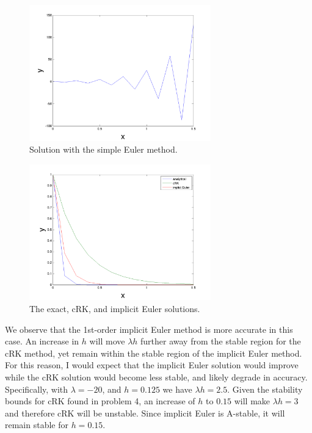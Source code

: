 \documentclass[11pt]{article}
\begin{document}
\begin{enumerate}
\begin{figure}[h!]
  \centering
    \includegraphics[width=0.7\textwidth]{andy_hw04_prb07_01.png}
  \caption{Solution with the simple Euler method.}
\end{figure}

\begin{figure}[h!]
  \centering
    \includegraphics[width=0.7\textwidth]{andy_hw04_prb07_02.png}
  \caption{The exact, cRK, and implicit Euler solutions.}
\end{figure}

We observe that the 1st-order implicit Euler method is more accurate in this case.
An increase in $h$ will move $\lambda h$ further away from the stable region for the cRK method, yet remain within the stable region of the implicit Euler method.
For this reason, I would expect that the implicit Euler solution would improve while the cRK solution would become less stable, and likely degrade in accuracy.
Specifically, with $\lambda = -20$, and $h = 0.125$ we have $\lambda h = 2.5$.
Given the stability bounds for cRK found in problem 4, an increase of $h$ to $0.15$ will make $\lambda h = 3$ and therefore cRK will be unstable.
Since implicit Euler is A-stable, it will remain stable for $h = 0.15$.


\end{enumerate}
\end{document}
